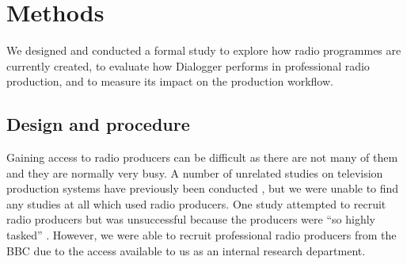 





\section{Methods}\label{sec:methods}
We designed and conducted a formal study to explore how radio programmes are currently created, to evaluate how
Dialogger performs in professional radio production, and to measure its impact on the production workflow. 

\subsection{Design and procedure}
Gaining access to radio producers can be difficult as there are not many of them and they are normally very busy. A
number of unrelated studies on television production systems have previously been conducted
\citep{Engstroem2010,Perry2009}, but we were unable to find any studies at all which used radio producers. One study
attempted to recruit radio producers but was unsuccessful because the producers were ``so highly tasked''
\citep{Kim2003}. However, we were able to recruit professional radio producers from the BBC due to the access available
to us as an internal research department.


